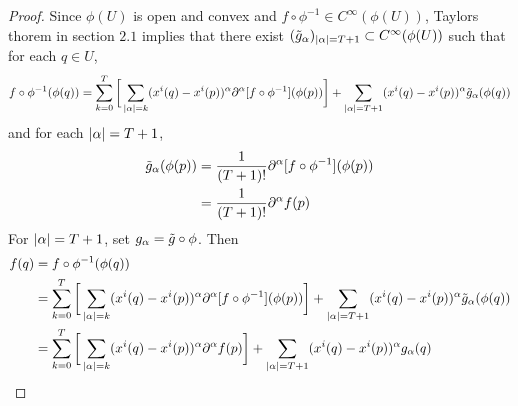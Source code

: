 \documentclass{book}
\begin{document}
\begin{proof}
	Since $\phi(U)$ is open and convex and $f \circ \phi^{-1} \in C^{\infty}(\phi(U))$, Taylors thorem in section $2.1$ implies that there exist $(\tilde{g}_{\alpha})_{|\alpha| = T+1} \subset C^{\infty}(\phi(U))$ such that for each $q \in U$, 
	$$f \circ \phi^{-1} (\phi(q)) = \sum_{k=0}^{T} \bigg[\sum_{|\alpha| = k}(x^i(q) - x^i(p))^{\alpha} \partial^{\alpha} [f \circ \phi^{-1}] (\phi(p)) \bigg] + \sum_{|\alpha| = T+1}(x^i(q) - x^i(p))^{\alpha} \tilde{g}_{\alpha}(\phi(q)) $$	
	and for each $|\alpha|= T+1$, 
	\begin{align*}
		\tilde{g}_{\alpha}(\phi(p)) 
		&= \frac{1}{(T+1)!}\partial^{\alpha} [f \circ \phi^{-1}](\phi(p)) \\
		&= \frac{1}{(T+1)!}\partial^{\alpha} f (p)
	\end{align*}
	For $|\alpha| = T+1$, set $g_{\alpha} = \tilde{g} \circ \phi$. Then 
	\begin{align*}
		f(q) 
		&= f \circ \phi^{-1} (\phi(q)) \\
		&= \sum_{k=0}^{T} \bigg[\sum_{|\alpha| = k}(x^i(q) - x^i(p))^{\alpha} \partial^{\alpha} [f \circ \phi^{-1}] (\phi(p)) \bigg] + \sum_{|\alpha| = T+1}(x^i(q) - x^i(p))^{\alpha} \tilde{g}_{\alpha}(\phi(q)) \\
		&= \sum_{k=0}^{T} \bigg[\sum_{|\alpha| = k}(x^i(q) - x^i(p))^{\alpha} \partial^{\alpha} f(p) \bigg] + \sum_{|\alpha| = T+1}(x^i(q) - x^i(p))^{\alpha} g_{\alpha}(q) \\
	\end{align*}			
\end{proof}
\end{document}
